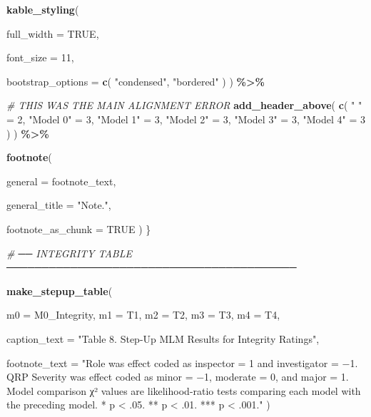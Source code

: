\documentclass[
]{article}
\newenvironment{Shaded}{\begin{snugshade}}{\end{snugshade}}
\newcommand{\AttributeTok}[1]{\textcolor[rgb]{0.13,0.29,0.53}{#1}}
\newcommand{\CommentTok}[1]{\textcolor[rgb]{0.56,0.35,0.01}{\textit{#1}}}
\newcommand{\ConstantTok}[1]{\textcolor[rgb]{0.56,0.35,0.01}{#1}}
\newcommand{\DecValTok}[1]{\textcolor[rgb]{0.00,0.00,0.81}{#1}}
\newcommand{\FunctionTok}[1]{\textcolor[rgb]{0.13,0.29,0.53}{\textbf{#1}}}
\newcommand{\NormalTok}[1]{#1}
\newcommand{\OtherTok}[1]{\textcolor[rgb]{0.56,0.35,0.01}{#1}}
\newcommand{\SpecialCharTok}[1]{\textcolor[rgb]{0.81,0.36,0.00}{\textbf{#1}}}
\newcommand{\StringTok}[1]{\textcolor[rgb]{0.31,0.60,0.02}{#1}}
\begin{document}
\begin{Shaded}
\begin{Highlighting}[]
    \FunctionTok{kable\_styling}\NormalTok{(}

      \AttributeTok{full\_width =} \ConstantTok{TRUE}\NormalTok{,}

      \AttributeTok{font\_size =} \DecValTok{11}\NormalTok{,}

      \AttributeTok{bootstrap\_options =}
        \FunctionTok{c}\NormalTok{(}
          \StringTok{"condensed"}\NormalTok{,}
          \StringTok{"bordered"}
\NormalTok{        )}
\NormalTok{    ) }\SpecialCharTok{\%\textgreater{}\%}

    \CommentTok{\# THIS WAS THE MAIN ALIGNMENT ERROR}
\FunctionTok{add\_header\_above}\NormalTok{(}
  \FunctionTok{c}\NormalTok{(}
    \StringTok{" "} \OtherTok{=} \DecValTok{2}\NormalTok{,}
    \StringTok{"Model 0"} \OtherTok{=} \DecValTok{3}\NormalTok{,}
    \StringTok{"Model 1"} \OtherTok{=} \DecValTok{3}\NormalTok{,}
    \StringTok{"Model 2"} \OtherTok{=} \DecValTok{3}\NormalTok{,}
    \StringTok{"Model 3"} \OtherTok{=} \DecValTok{3}\NormalTok{,}
    \StringTok{"Model 4"} \OtherTok{=} \DecValTok{3}
\NormalTok{  )}
\NormalTok{    ) }\SpecialCharTok{\%\textgreater{}\%}

    \FunctionTok{footnote}\NormalTok{(}

      \AttributeTok{general =}
\NormalTok{        footnote\_text,}

      \AttributeTok{general\_title =}
        \StringTok{"Note."}\NormalTok{,}

      \AttributeTok{footnote\_as\_chunk =}
        \ConstantTok{TRUE}
\NormalTok{    )}
\NormalTok{\}}
\end{Highlighting}
\end{Shaded}

\begin{Shaded}
\begin{Highlighting}[]
\CommentTok{\# ── INTEGRITY TABLE ─────────────────────────────────────────}

\FunctionTok{make\_stepup\_table}\NormalTok{(}

  \AttributeTok{m0 =}\NormalTok{ M0\_Integrity,}
  \AttributeTok{m1 =}\NormalTok{ T1,}
  \AttributeTok{m2 =}\NormalTok{ T2,}
  \AttributeTok{m3 =}\NormalTok{ T3,}
  \AttributeTok{m4 =}\NormalTok{ T4,}

  \AttributeTok{caption\_text =}
    \StringTok{"Table 8. Step{-}Up MLM Results for Integrity Ratings"}\NormalTok{,}

  \AttributeTok{footnote\_text =}
    \StringTok{"Role was effect coded as inspector = 1 and investigator = −1. QRP Severity was effect coded as minor = −1, moderate = 0, and major = 1. Model comparison χ² values are likelihood{-}ratio tests comparing each model with the preceding model. * p \textless{} .05. ** p \textless{} .01. *** p \textless{} .001."}
\NormalTok{)}
\end{Highlighting}
\end{Shaded}
\end{document}
